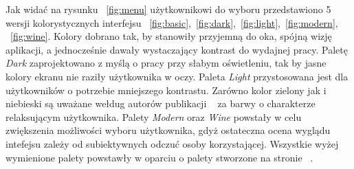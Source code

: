 \documentclass[twoside,a4paper]{book}
\begin{document}
 Jak widać na rysunku ~\ref{fig:menu} użytkownikowi  do wyboru przedstawiono 5 wersji kolorystycznych interfejsu ~\ref{fig:basic},~\ref{fig:dark},~\ref{fig:light},~\ref{fig:modern}, ~\ref{fig:wine}. 
 Kolory dobrano tak, by stanowiły przyjemną do oka, spójną wizję aplikacji, a jednocześnie dawały wystaczający kontrast do  wydajnej pracy. Paletę \textit{Dark} zaprojektowano z myślą o pracy przy słabym oświetleniu, tak by jasne kolory ekranu nie raziły użytkownika w oczy. Paleta \textit{Light} przystosowana jest dla użytkowników o potrzebie mniejszego kontrastu. Zarówno kolor zielony jak i niebieski są uważane wełdug autorów publikacji ~\cite{uiColor} za barwy o charakterze relaksującym użytkownika. Palety \textit{Modern} oraz \textit{Wine} powstały w celu zwiększenia możliwości wyboru użytkownika, gdyż ostateczna ocena wyglądu intefejsu zależy od subiektywnych odczuć osoby korzystającej. Wszystkie wyżej wymienione palety powstawły w oparciu o palety stworzone na stronie ~\cite{uiColorContrast}.
 
\end{document}

